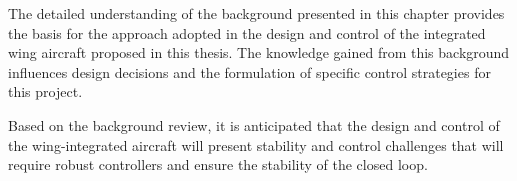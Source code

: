 The detailed understanding of the background presented in this chapter provides the basis for the approach adopted in the design and control of the integrated wing aircraft proposed in this thesis. The knowledge gained from this background influences design decisions and the formulation of specific control strategies for this project.

Based on the background review, it is anticipated that the design and control of the wing-integrated aircraft will present stability and control challenges that will require robust controllers and ensure the stability of the closed loop. 


%



